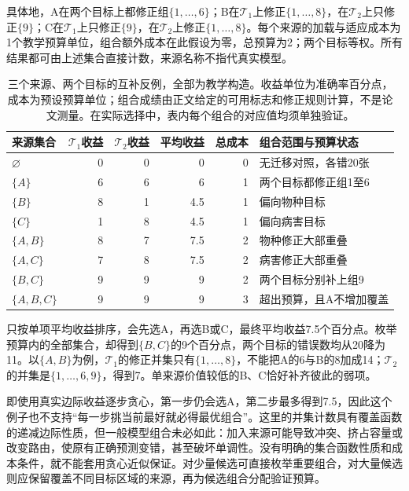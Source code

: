具体地，A在两个目标上都修正组$\{1,\ldots,6\}$；B在$\mathcal T_1$上修正$\{1,\ldots,8\}$，在$\mathcal T_2$上只修正$\{9\}$；C在$\mathcal T_1$上只修正$\{9\}$，在$\mathcal T_2$上修正$\{1,\ldots,8\}$。每个来源的加载与适应成本为1个教学预算单位，组合额外成本在此假设为零，总预算为2；两个目标等权。所有结果都可由上述集合直接计数，来源名称不指代真实模型。

\begin{table}[htbp]
  \centering
  \small
  \begin{tabularx}{\linewidth}{lrrrrX}
    \toprule
    来源集合 & $\mathcal T_1$收益 & $\mathcal T_2$收益 & 平均收益 & 总成本 & 组合范围与预算状态 \\
    \midrule
    $\varnothing$ & 0 & 0 & 0 & 0 & 无迁移对照，各错20张 \\
    $\{A\}$ & 6 & 6 & 6 & 1 & 两个目标都修正组1至6 \\
    $\{B\}$ & 8 & 1 & 4.5 & 1 & 偏向物种目标 \\
    $\{C\}$ & 1 & 8 & 4.5 & 1 & 偏向病害目标 \\
    $\{A,B\}$ & 8 & 7 & 7.5 & 2 & 物种修正大部重叠 \\
    $\{A,C\}$ & 7 & 8 & 7.5 & 2 & 病害修正大部重叠 \\
    $\{B,C\}$ & 9 & 9 & 9 & 2 & 两个目标分别补上组9 \\
    $\{A,B,C\}$ & 9 & 9 & 9 & 3 & 超出预算，且A不增加覆盖 \\
    \bottomrule
  \end{tabularx}
  \caption{三个来源、两个目标的互补反例，全部为教学构造。收益单位为准确率百分点，成本为预设预算单位；组合成绩由正文给定的可用标志和修正规则计算，不是论文测量。在实际选择中，表内每个组合的对应值均须单独验证。}
  \label{tab:ket-reuse-complementarity}
\end{table}

只按单项平均收益排序，会先选A，再选B或C，最终平均收益7.5个百分点。枚举预算内的全部集合，却得到$\{B,C\}$的9个百分点，两个目标的错误数均从20降为11。以$\{A,B\}$为例，$\mathcal T_1$的修正并集只有$\{1,\ldots,8\}$，不能把A的6与B的8加成14；$\mathcal T_2$的并集是$\{1,\ldots,6,9\}$，得到7。单来源价值较低的B、C恰好补齐彼此的弱项。

即使用真实边际收益逐步贪心，第一步仍会选A，第二步最多得到7.5，因此这个例子也不支持“每一步挑当前最好就必得最优组合”。这里的并集计数具有覆盖函数的递减边际性质，但一般模型组合未必如此：加入来源可能导致冲突、挤占容量或改变路由，使原有正确预测变错，甚至破坏单调性。没有明确的集合函数性质和成本条件，就不能套用贪心近似保证。对少量候选可直接枚举重要组合，对大量候选则应保留覆盖不同目标区域的来源，再为候选组合分配验证预算。

